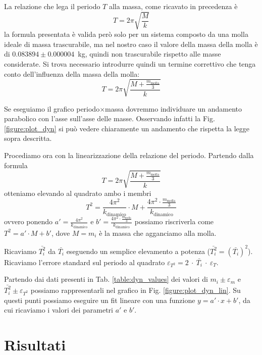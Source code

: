 \documentclass[italian, a4paper, 10pt, twocolumn]{../../style/lab_unige}
\newcommand{\reftab}[1]{Tab. {\ref{#1}}}%
\newcommand{\reffig}[1]{Fig. {\ref{#1}}}%
\begin{document}
{    La relazione che lega il periodo $T$ alla massa, come ricavato in precedenza è
    \[
        T = 2 \pi \sqrt{\frac{M}{k}}
    \]
    la formula presentata è valida però solo per un sistema composto da una molla ideale di massa trascurabile, 
    ma nel nostro caso il valore della massa della molla è di $0.083894\pm0.000004$~kg, quindi non trascurabile 
    rispetto alle masse considerate.
    Si trova necessario introdurre quindi un termine correttivo che tenga conto dell'influenza della massa della
    molla:
    \[
        T = 2 \pi \sqrt{\frac{M+\frac{m_{\text{molla}}}{3}}{k}}
    \]
    
    Se eseguiamo il grafico periodo$\times$massa dovremmo individuare un andamento parabolico con l'asse sull'asse 
    delle masse. Osservando infatti la \reffig{figure:plot_dyn} si può vedere chiaramente un andamento che rispetta
    la legge sopra descritta.

    Procediamo ora con la linearizzazione della relazione del periodo. Partendo dalla formula
    \[
        T = 2 \pi \sqrt{\frac{M+\frac{m_{\text{molla}}}{3}}{k}}
    \]
    otteniamo elevando al quadrato ambo i membri
    \[
        T^2 = \frac{4 \pi^2}{k_{\text{dinamico}}} \cdot M + \frac{4 \pi^2 \cdot 
        \frac{m_{\text{molla}}}{3}}{k_{\text{dinamico}}}
    \]
    ovvero ponendo $a'=\frac{4 \pi^2}{k_{\text{dinamico}}}$ e 
    $b'=\frac{4 \pi^2 \cdot \frac{m_{\text{molla}}}{3}}{k_{\text{dinamico}}}$ possiamo riscriverla come 
    $T^2 = a'\cdot M + b'$, 
    dove $M=m_i$ è la massa che agganciamo alla molla.

    Ricaviamo $\bar{T_i^2}$ da $\bar{T_i}$ eseguendo un semplice elevamento a potenza ($\bar{T_i^2}=
    (\bar{T_i})^2$).
    Ricaviamo l'errore standard sul periodo al quadrato $\varepsilon_{T^2} = 2~\cdot~\bar{T_i}~\cdot~
    \varepsilon_{T}$.

    Partendo dai dati presenti in \reftab{table:dyn_values} dei valori di $m_i\pm\varepsilon_m$ e 
    $\bar{T_i^2}\pm\varepsilon_{T^2}$ possiamo rappresentarli nel grafico in \reffig{figure:plot_dyn_lin}.
    Su questi punti possiamo eseguire un fit lineare con una funzione $y = a'\cdot x + b'$, da cui ricaviamo i 
    valori dei parametri $a'$ e $b'$.

    \section{Risultati}
    \label{section:results}

}
\end{document}
